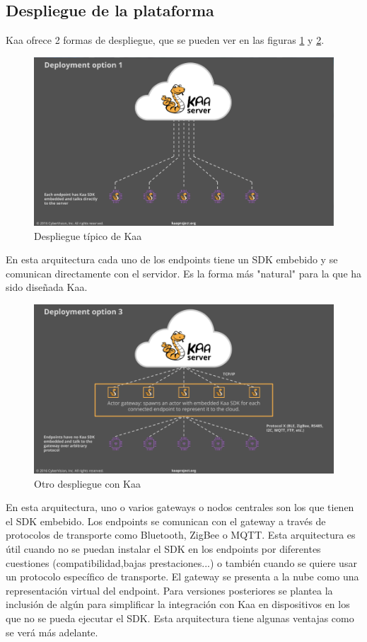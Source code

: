 \documentclass[12pt, twoside]{book}
\newcommand{\MYhref}[3][blue]{\href{#2}{\color{#1}{#3}}}
\begin{document}
\subsection*{Despliegue de la plataforma}
Kaa ofrece 2 formas de despliegue, que se pueden ver en las figuras \ref{deployment1} y \ref{deployment2}.
\begin{figure}[H]
\centering
\includegraphics[scale=0.4]{images/deployment1_kaa}
\caption{Despliegue típico de Kaa}\label{deployment1}
\end{figure} 
En esta arquitectura cada uno de los endpoints tiene un SDK embebido y se comunican directamente con el servidor. Es la forma más "natural" para la que ha sido diseñada Kaa.
\begin{figure}[H]
\centering
\includegraphics[scale=0.4]{images/deployment2}
\caption{Otro despliegue con Kaa}\label{deployment2}
\end{figure} 
En esta arquitectura, uno o varios gateways o nodos centrales son los que tienen el SDK embebido. Los endpoints se comunican con el gateway a través de protocolos de transporte como Bluetooth, ZigBee o MQTT. Esta arquitectura es útil cuando no se puedan instalar el SDK en los endpoints por diferentes cuestiones (compatibilidad,bajas prestaciones...) o también cuando se quiere usar un protocolo específico de transporte. El gateway se presenta a la nube como una representación virtual del endpoint. Para versiones posteriores se plantea la inclusión de algún \MYhref{http://jira.kaaproject.org/browse/KAA-752}{framework} para simplificar la integración con Kaa en dispositivos en los que no se pueda ejecutar el SDK. Esta arquitectura tiene algunas ventajas como se verá más adelante.
\end{document}
